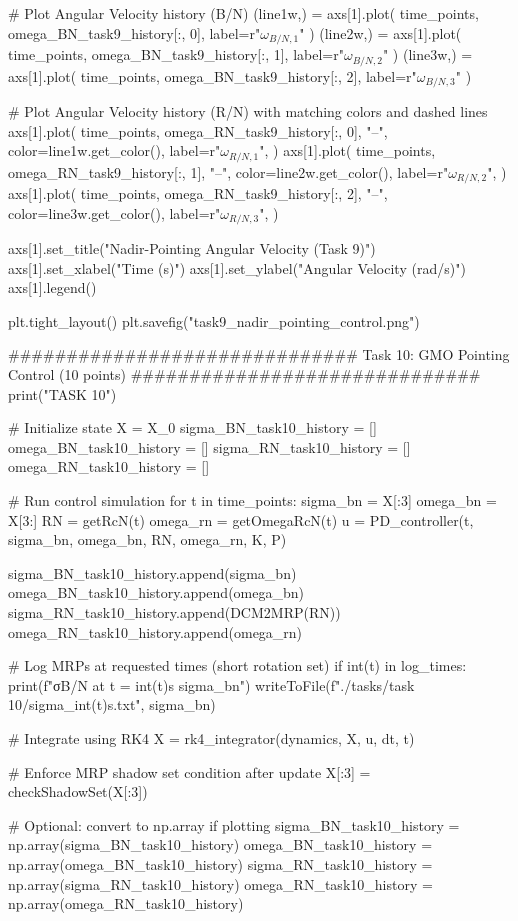 \documentclass[conf]{new-aiaa}
\begin{document}
\begin{pythoncode}
# Plot Angular Velocity history (B/N)
(line1w,) = axs[1].plot(
    time_points, omega_BN_task9_history[:, 0], label=r"$\omega_{B/N,1}$"
)
(line2w,) = axs[1].plot(
    time_points, omega_BN_task9_history[:, 1], label=r"$\omega_{B/N,2}$"
)
(line3w,) = axs[1].plot(
    time_points, omega_BN_task9_history[:, 2], label=r"$\omega_{B/N,3}$"
)

# Plot Angular Velocity history (R/N) with matching colors and dashed lines
axs[1].plot(
    time_points,
    omega_RN_task9_history[:, 0],
    "--",
    color=line1w.get_color(),
    label=r"$\omega_{R/N,1}$",
)
axs[1].plot(
    time_points,
    omega_RN_task9_history[:, 1],
    "--",
    color=line2w.get_color(),
    label=r"$\omega_{R/N,2}$",
)
axs[1].plot(
    time_points,
    omega_RN_task9_history[:, 2],
    "--",
    color=line3w.get_color(),
    label=r"$\omega_{R/N,3}$",
)

axs[1].set_title("Nadir-Pointing Angular Velocity (Task 9)")
axs[1].set_xlabel("Time (s)")
axs[1].set_ylabel("Angular Velocity (rad/s)")
axs[1].legend()

plt.tight_layout()
plt.savefig("task9_nadir_pointing_control.png")


############################## Task 10: GMO Pointing Control (10 points) ##############################
print("\n\nBEGIN TASK 10")

# Initialize state
X = X_0
sigma_BN_task10_history = []
omega_BN_task10_history = []
sigma_RN_task10_history = []
omega_RN_task10_history = []

# Run control simulation
for t in time_points:
    sigma_bn = X[:3]
    omega_bn = X[3:]
    RN = getRcN(t)
    omega_rn = getOmegaRcN(t)
    u = PD_controller(t, sigma_bn, omega_bn, RN, omega_rn, K, P)

    sigma_BN_task10_history.append(sigma_bn)
    omega_BN_task10_history.append(omega_bn)
    sigma_RN_task10_history.append(DCM2MRP(RN))
    omega_RN_task10_history.append(omega_rn)

    # Log MRPs at requested times (short rotation set)
    if int(t) in log_times:
        print(f"σB/N at t = {int(t)}s {sigma_bn}")
        writeToFile(f"./tasks/task 10/sigma_{int(t)}s.txt", sigma_bn)

    # Integrate using RK4
    X = rk4_integrator(dynamics, X, u, dt, t)

    # Enforce MRP shadow set condition after update
    X[:3] = checkShadowSet(X[:3])

# Optional: convert to np.array if plotting
sigma_BN_task10_history = np.array(sigma_BN_task10_history)
omega_BN_task10_history = np.array(omega_BN_task10_history)
sigma_RN_task10_history = np.array(sigma_RN_task10_history)
omega_RN_task10_history = np.array(omega_RN_task10_history)


\end{pythoncode}
\end{document}
